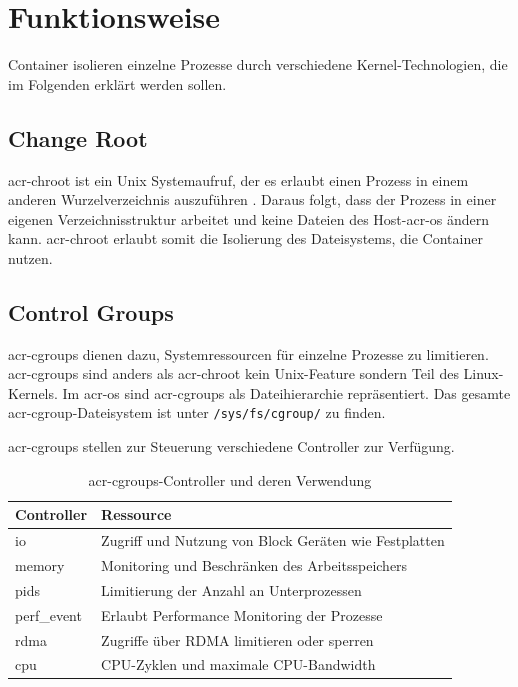 \section{Funktionsweise}
\label{sec:funktionsweise}

Container isolieren einzelne Prozesse durch verschiedene Kernel-Technologien, die im Folgenden erklärt werden sollen.
\subsection{Change Root}
\label{sec:chroot}
\Gls{acr-chroot} ist ein Unix Systemaufruf, der es erlaubt einen Prozess in einem anderen Wurzelverzeichnis auszuführen \citep{Chroot1LinuxManualPage}. Daraus folgt, dass der Prozess in einer eigenen Verzeichnisstruktur arbeitet und keine Dateien des Host-\gls{acr-os} ändern kann. \Gls{acr-chroot} erlaubt somit die Isolierung des Dateisystems, die Container nutzen.

\subsection{Control Groups}
\label{sec:cgroups}
\Glspl{acr-cgroup} dienen dazu, Systemressourcen für einzelne Prozesse zu limitieren. \Glspl{acr-cgroup} sind anders als \gls{acr-chroot} kein Unix-Feature sondern Teil des Linux-Kernels. Im \gls{acr-os} sind \glspl{acr-cgroup} als Dateihierarchie repräsentiert. Das gesamte \gls{acr-cgroup}-Dateisystem ist unter \texttt{/sys/fs/cgroup/} zu finden.

\Glspl{acr-cgroup} stellen zur Steuerung verschiedene Controller zur Verfügung.
\begin{table}[H]
	\begin{center}
		\begin{tabular}{ll}
			\toprule
			Controller 	& Ressource 												\\
			\midrule
			io			& Zugriff und Nutzung von Block Geräten wie Festplatten		\\
			memory		& Monitoring und Beschränken des Arbeitsspeichers 			\\
			pids		& Limitierung der Anzahl an Unterprozessen					\\
			perf\_event	& Erlaubt Performance Monitoring der Prozesse				\\
			rdma		& Zugriffe über RDMA limitieren oder sperren				\\
			cpu			& CPU-Zyklen und maximale CPU-Bandwidth						\\
			\bottomrule
		\end{tabular}
		\caption{\Glspl{acr-cgroup}-Controller und deren Verwendung \citep{Cgroups7LinuxManualPage}}
		\label{tab:cgroupController}
	\end{center}
\end{table}


